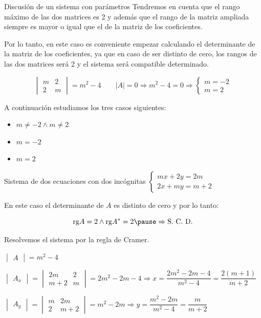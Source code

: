 \documentclass[9pt]{beamer}
\begin{document}
\begin{frame}{Discusión de un sistema con parámetros}
Tendremos en cuenta que el rango máximo de las dos matrices es 2 y además que el rango de la matriz ampliada siempre es mayor o igual que el de la matriz de los coeficientes.

Por lo tanto, en este caso es conveniente empezar calculando el determinante de la matriz de los coeficientes, ya que en caso de ser distinto de cero, los rangos de las dos matrices será 2 y el sistema será compatible determinado. 

\pause
\[ \begin{vmatrix}
m & 2 \\ 2 & m 
\end{vmatrix}= m^2 -4  \qquad |A| = 0 \Rightarrow m^2-4 = 0 \Rightarrow \begin{cases} m= -2 \\ m= 2 \end{cases} \]

\pause

A continuación estudiamos los tres casos siguientes:  
\pause
\begin{itemize}[<+->]
\item $m \neq -2 \wedge m \neq 2 $
\item $m=-2$
\item $m=2$
\end{itemize}


\end{frame}

\begin{frame}{Sistema de dos ecuaciones con dos incógnitas $ \begin{cases} mx+2y = 2m \\ 2x+my = m+2 \end{cases}$ }


\pause
En este caso el determinante de $A$ es distinto de cero y por lo tanto:

\[ \text{rg} A = 2 \wedge \text{rg}A^* =2 \pause \Rightarrow \text{S. C. D.} \]

\pause
Resolvemos el sistema por la regla de Cramer.



\pause
$\begin{vmatrix}
A
\end{vmatrix}= m^2-4 $

\pause
$\begin{vmatrix}
A_x
\end{vmatrix}= \begin{vmatrix}
2m & 2 \\ m+2 & m  
\end{vmatrix} = 2m^2-2m-4 \Rightarrow x= \dfrac{2m^2-2m-4}{m^2-4}=  \dfrac{2(m+1)}{m+2}$

\pause 
$\begin{vmatrix}
A_y
\end{vmatrix}=\begin{vmatrix}
m & 2m \\ 2 & m+2  
\end{vmatrix} = m^2-2m \Rightarrow y= \dfrac{m^2-2m}{m^2-4}=  \dfrac{m}{m+2} $
\end{frame}
\end{document}
